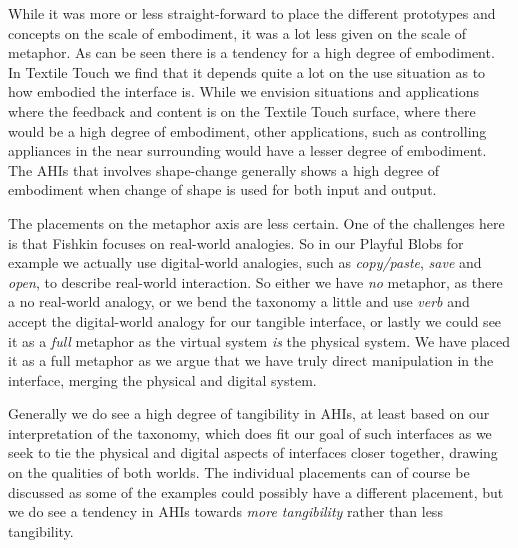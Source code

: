 While it was more or less straight-forward to place the different prototypes and concepts on the scale of embodiment, it was a lot less given on the scale of metaphor.
As can be seen there is a tendency for a high degree of embodiment.
In Textile Touch we find that it depends quite a lot on the use situation as to how embodied the interface is.
While we envision situations and applications where the feedback and content is on the Textile Touch surface, where there would be a high degree of embodiment, other applications, such as controlling appliances in the near surrounding would have a lesser degree of embodiment.
The AHIs that involves shape-change generally shows a high degree of embodiment when change of shape is used for both input and output.

The placements on the metaphor axis are less certain.
One of the challenges here is that Fishkin focuses on real-world analogies.
So in our Playful Blobs for example we actually use digital-world analogies, such as \emph{copy/paste}, \emph{save} and \emph{open}, to describe real-world interaction.
So either we have \emph{no} metaphor, as there a no real-world analogy, or we bend the taxonomy a little and use \emph{verb} and accept the digital-world analogy for our tangible interface, or lastly we could see it as a \emph{full} metaphor as the virtual system \emph{is} the
physical system. 
We have placed it as a full metaphor as we argue that we have truly direct manipulation in the interface, merging the physical and digital system.

Generally we do see a high degree of tangibility in AHIs, at least based on our interpretation of the taxonomy, which does fit our goal of such interfaces as we seek to tie the physical and digital aspects of interfaces closer together, drawing on the qualities of both worlds.
The individual placements can of course be discussed as some of the examples could possibly have a different placement, but we do see a tendency in AHIs towards \emph{more tangibility} rather than less tangibility. 
